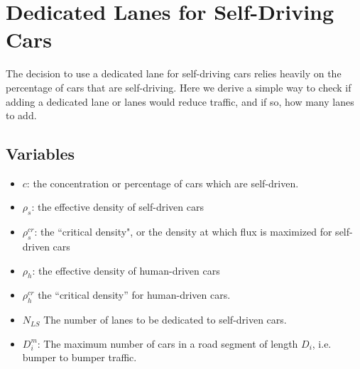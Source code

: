 
\section{Dedicated Lanes for Self-Driving Cars} \label{sec:discussion}

The decision to use a dedicated lane for self-driving cars relies heavily on the percentage of cars that are self-driving. Here we derive a simple way to check if adding a dedicated lane or lanes would reduce traffic, and if so, how many lanes to add.

\subsection{Variables}
\begin{itemize}
	\item $c$: the concentration or percentage of cars which are self-driven.
    \item $\rho_{s}$: the effective density of self-driven cars
    \item $\rho_{s}^{cr}$: the ``critical density", or the density at which flux is maximized for self-driven cars
    \item $\rho_{h}$: the effective density of human-driven cars
    \item $\rho_{h}^{cr}$ the ``critical density'' for human-driven cars.
    \item $N_{LS}$ The number of lanes to be dedicated to self-driven cars.
    \item $D_i^m$: The maximum number of cars in a road segment of length $D_i$, i.e. bumper to bumper traffic.
\end{itemize}

